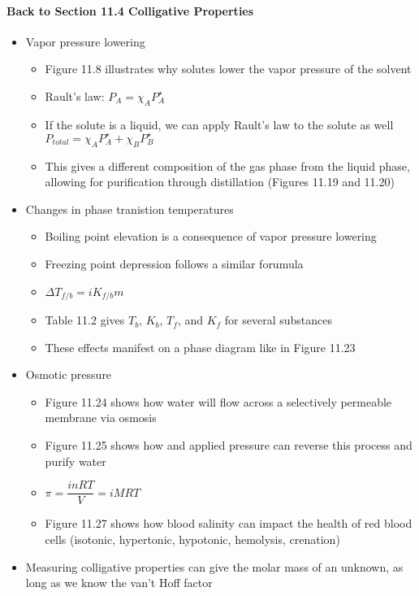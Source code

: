 \documentclass[12pt, openany, letterpaper]{memoir}
\begin{document}
\paragraph*{Back to Section 11.4  Colligative Properties}
\begin{itemize}
  \item Vapor pressure lowering
  \begin{itemize}
    \item Figure 11.8 illustrates why solutes lower the vapor pressure of the solvent
    \item Rault's law: $P_A=\chi_AP^\star_A$
    \item If the solute is a liquid, we can apply Rault's law to the solute as well $P_{total}=\chi_AP^\star_A+\chi_BP^\star_B$
    \item This gives a different composition of the gas phase from the liquid phase, allowing for purification through distillation (Figures 11.19 and 11.20)
  \end{itemize}
  \item Changes in phase tranistion temperatures
    \begin{itemize}
      \item Boiling point elevation is a consequence of vapor pressure lowering
      \item Freezing point depression follows a similar forumula 
      \item $\Delta T_{f/b}=iK_{f/b}m$
      \item Table 11.2 gives $T_b$, $K_b$, $T_f$, and $K_f$ for several substances
      \item These effects manifest on a phase diagram like in Figure 11.23
    \end{itemize}
  \item Osmotic pressure
  \begin{itemize}
    \item Figure 11.24 shows how water will flow across a selectively permeable membrane via osmosis
    \item Figure 11.25 shows how and applied pressure can reverse this process and purify water
    \item $\pi=\dfrac{inRT}{V} = iMRT$
    \item Figure 11.27 shows how blood salinity can impact the health of red blood cells (isotonic, hypertonic, hypotonic, hemolysis, crenation)
  \end{itemize}
  \item Measuring colligative properties can give the molar mass of an unknown, as long as we know the van't Hoff factor
\end{itemize}
\end{document}
